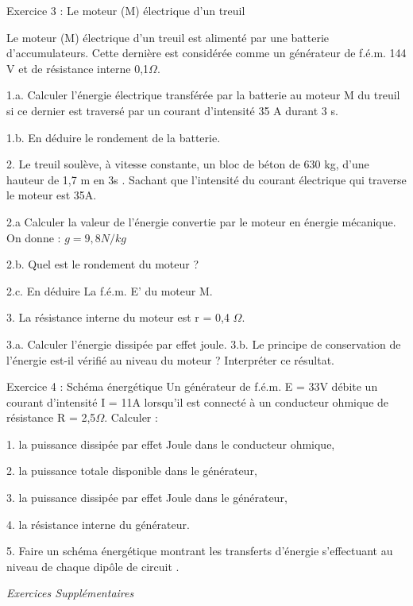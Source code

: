 \documentclass[12pt, french]{article}
\begin{document}
\begin{Box2}{Exercice 3 :  Le moteur (M) électrique d’un treuil }

   Le moteur (M) électrique d’un treuil est alimenté par une batterie d’accumulateurs. Cette dernière est considérée comme un générateur de f.é.m. 144 V et de résistance interne 0,1$\Omega$.

1.a. Calculer l’énergie électrique transférée par la batterie au moteur M du treuil si ce dernier est traversé par un courant d’intensité 35 A durant 3 s.

1.b. En déduire le rondement de la batterie.

2. Le treuil soulève, à vitesse constante, un bloc de béton de 630 kg, d’une hauteur de 1,7 m en 3s . Sachant que l’intensité du courant électrique qui traverse le moteur est 35A.

2.a  Calculer la valeur de l’énergie convertie par le moteur en énergie mécanique.
On donne : $g = 9,8 N/kg$

2.b. Quel est le rondement du moteur ?

2.c. En déduire La f.é.m. E’ du moteur M.

3. La résistance interne du moteur est r = 0,4 $\Omega$.

3.a. Calculer l’énergie dissipée par effet joule.
3.b. Le principe de conservation de l’énergie est-il vérifié au niveau du moteur ? Interpréter ce
résultat.
\end{Box2}

\begin{Box2}{Exercice 4 : Schéma énergétique}
   Un générateur de f.é.m. E = 33V débite un courant d’intensité I = 11A lorsqu’il est connecté à un conducteur
ohmique de résistance R = 2,5$\Omega$. Calculer :

   1. la puissance dissipée par effet Joule dans le conducteur ohmique,

   2. la puissance totale disponible dans le générateur,

   3. la puissance dissipée par effet Joule dans le générateur,

   4. la résistance interne du générateur.

   5. Faire un schéma énergétique montrant les transferts d’énergie s’effectuant au niveau de chaque dipôle de
circuit .
\end{Box2}
\begin{center}
   \Large{ \em{Exercices Supplémentaires}}
\end{center}
\end{document}
